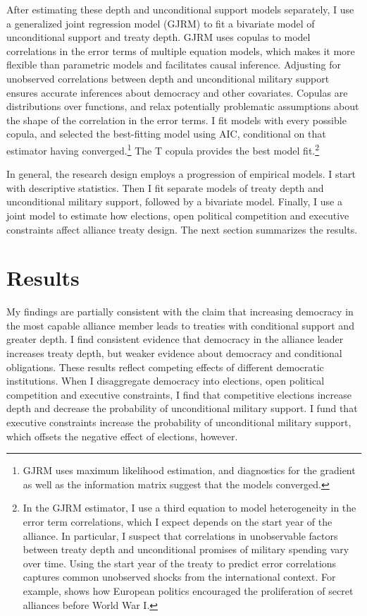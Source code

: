 \documentclass[12pt]{article}
\begin{document}
After estimating these depth and unconditional support models separately, I use a generalized joint regression model (GJRM) \citep{Braumoelleretal2018} to fit a bivariate model of unconditional support and treaty depth.
GJRM uses copulas to model correlations in the error terms of multiple equation models, which makes it more flexible than parametric models and facilitates causal inference. 
Adjusting for unobserved correlations between depth and unconditional military support ensures accurate inferences about democracy and other covariates. 
Copulas are distributions over functions, and relax potentially problematic assumptions about the shape of the correlation in the error terms. 
I fit models with every possible copula, and selected the best-fitting model using AIC, conditional on that estimator having converged.\footnote{GJRM uses maximum likelihood estimation, and diagnostics for the gradient as well as the information matrix suggest that the models converged.} 
The T copula provides the best model fit.\footnote{In the GJRM estimator, I use a third equation to model heterogeneity in the error term correlations, which I expect depends on the start year of the alliance. 
In particular, I suspect that correlations in unobservable factors between treaty depth and unconditional promises of military spending vary over time. 
Using the start year of the treaty to predict error correlations captures common unobserved shocks from the international context. 
For example, \citet{Kuo2019} shows how European politics encouraged the proliferation of secret alliances before World War I.}


In general, the research design employs a progression of empirical models. 
I start with descriptive statistics. 
Then I fit separate models of treaty depth and unconditional military support, followed by a bivariate model. 
Finally, I use a joint model to estimate how elections, open political competition and executive constraints affect alliance treaty design. 
The next section summarizes the results. 


\section{Results}


My findings are partially consistent with the claim that increasing democracy in the most capable alliance member leads to treaties with conditional support and greater depth. 
I find consistent evidence that democracy in the alliance leader increases treaty depth, but weaker evidence about democracy and conditional obligations. 
These results reflect competing effects of different democratic institutions. 
When I disaggregate democracy into elections, open political competition and executive constraints, I find that competitive elections increase depth and decrease the probability of unconditional military support.
I fund that executive constraints increase the probability of unconditional military support, which offsets the negative effect of elections, however. 
\end{document}
